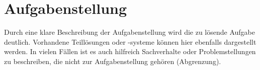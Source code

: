 
\chapter{Aufgabenstellung} %

\label{ch:aufgabenstellung} %


Durch eine klare Beschreibung der Aufgabenstellung wird die zu lösende Aufgabe
deutlich. Vorhandene Teillösungen oder -systeme können hier ebenfalls
dargestellt werden. In vielen Fällen ist es auch hilfreich Sachverhalte oder
Problemstellungen zu beschreiben, die nicht zur Aufgabenstellung gehören
(Abgrenzung).
